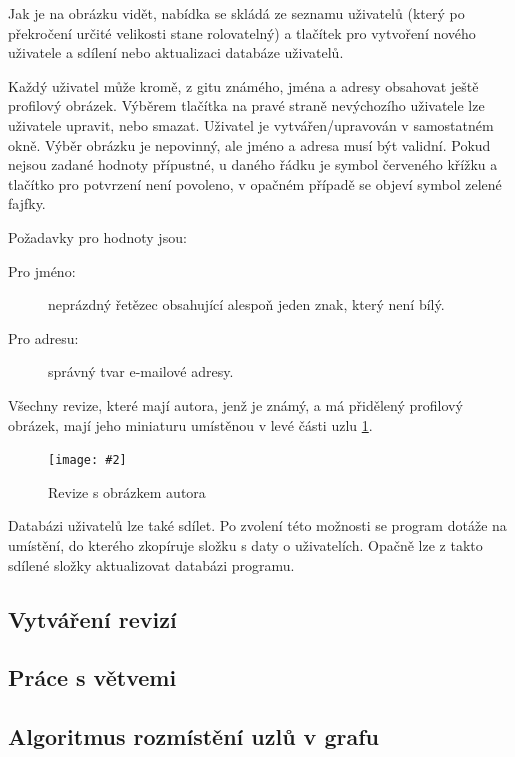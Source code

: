 \documentclass[
  biblatex,
  glossaries,
  index
]{kidiplom}
\newcommand{\pic}[4]{
\begin{figure}[h]
\centering
\texttt{[image: \#2]}
\caption{#3}
\label{fig:#4}
\end{figure}}
\begin{document}
Jak je na obrázku vidět, nabídka se skládá ze seznamu uživatelů (který po překročení určité velikosti stane rolovatelný) a tlačítek pro vytvoření nového uživatele a sdílení nebo aktualizaci databáze uživatelů.

Každý uživatel může kromě, z gitu známého, jména a adresy obsahovat ještě profilový obrázek. Výběrem tlačítka na pravé straně nevýchozího uživatele lze uživatele upravit, nebo smazat. Uživatel je vytvářen/upravován v samostatném okně. Výběr obrázku je nepovinný, ale jméno a adresa musí být validní. Pokud nejsou zadané hodnoty přípustné, u daného řádku je symbol červeného křížku a tlačítko pro potvrzení není povoleno, v opačném případě se objeví symbol zelené fajfky.

Požadavky pro hodnoty jsou:
\begin{description}
\item[Pro jméno:] neprázdný řetězec obsahující alespoň jeden znak, který není bílý.
\item[Pro adresu:] správný tvar e-mailové adresy.
\end{description}

Všechny revize, které mají autora, jenž je známý, a má přidělený profilový obrázek, mají jeho miniaturu umístěnou v levé části uzlu \ref{fig:user}.

\pic{10cm}{user.png}{Revize s obrázkem autora}{user}

Databázi uživatelů lze také sdílet. Po zvolení této možnosti se program dotáže na umístění, do kterého zkopíruje složku s daty o uživatelích. Opačně lze z takto sdílené složky aktualizovat databázi programu.

\subsection{Vytváření revizí}

\subsection{Práce s větvemi}

 



 




\subsection{Algoritmus rozmístění uzlů v grafu}
\label{subsec:algorithm}
\end{document}
